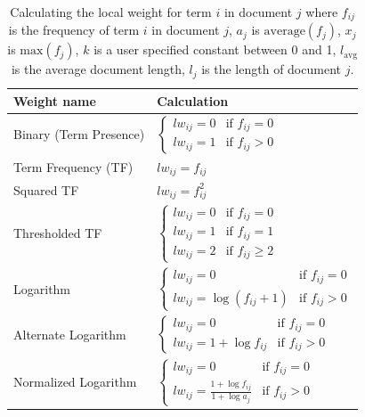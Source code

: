 \begin{table}[H]
\centering
\caption{Calculating the local weight for term $i$ in document $j$ where $f_{ij}$ is the frequency of term $i$ in document $j$, 
$a_j$ is $\mathrm{average}(f_j)$, $x_j$ is $\mathrm{max}(f_j)$, $k$ is a user specified constant between 0 and 1, 
$l_{\mathrm{avg}}$ is the average document length, $l_j$ is the length of document $j$.}
\renewcommand{\arraystretch}{1.3}
\begin{tabular}{l|l}
\hline
\textbf{Weight name} & \textbf{Calculation} \\
\hline
Binary (Term Presence) & 
$\begin{cases}
l w_{ij} = 0 & \text{if } f_{ij} = 0 \\
l w_{ij} = 1 & \text{if } f_{ij} > 0
\end{cases}$ \\

\hline
Term Frequency (TF) & $l w_{ij} = f_{ij}$ \\

\hline
Squared TF & $l w_{ij} = f_{ij}^2$ \\

\hline
Thresholded TF & 
$\begin{cases}
l w_{ij} = 0 & \text{if } f_{ij} = 0 \\
l w_{ij} = 1 & \text{if } f_{ij} = 1 \\
l w_{ij} = 2 & \text{if } f_{ij} \ge 2
\end{cases}$ \\

\hline
Logarithm &
$\begin{cases}
l w_{ij} = 0 & \text{if } f_{ij} = 0 \\
l w_{ij} = \log(f_{ij} + 1) & \text{if } f_{ij} > 0
\end{cases}$ \\

\hline
Alternate Logarithm &
$\begin{cases}
l w_{ij} = 0 & \text{if } f_{ij} = 0 \\
l w_{ij} = 1 + \log f_{ij} & \text{if } f_{ij} > 0
\end{cases}$ \\

\hline
Normalized Logarithm &
$\begin{cases}
l w_{ij} = 0 & \text{if } f_{ij} = 0 \\
l w_{ij} = \frac{1 + \log f_{ij}}{1 + \log a_j} & \text{if } f_{ij} > 0
\end{cases}$ \\


\end{tabular}
\end{table}
